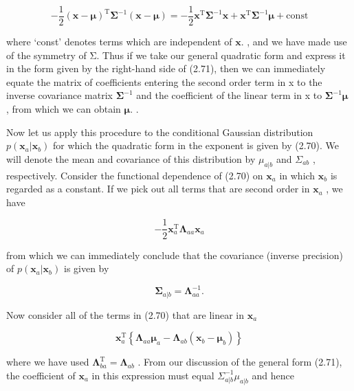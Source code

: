 \documentclass[
  10
]{article}
\begin{document}
\[
- \frac {1}{2} (\mathbf {x} - \boldsymbol {\mu}) ^ {\mathrm{T}} \boldsymbol {\Sigma} ^ {- 1} (\mathbf {x} - \boldsymbol {\mu}) = - \frac {1}{2} \mathbf {x} ^ {\mathrm{T}} \boldsymbol {\Sigma} ^ {- 1} \mathbf {x} + \mathbf {x} ^ {\mathrm{T}} \boldsymbol {\Sigma} ^ {- 1} \boldsymbol {\mu} + \mathrm{const}\tag{2.71}
\]

where `const' denotes terms which are independent of \(\mathbf { x } .\)
, and we have made use of the symmetry of Σ. Thus if we take our general
quadratic form and express it in the form given by the right-hand side
of (2.71), then we can immediately equate the matrix of coefficients
entering the second order term in x to the inverse covariance matrix
\(\pmb { \Sigma } ^ { - 1 }\) and the coefficient of the linear term in
x to \(\pmb { \Sigma } ^ { - 1 } \pmb { \mu }\) , from which we can
obtain \(\pmb { \mu } .\) .

Now let us apply this procedure to the conditional Gaussian distribution
\(p ( \mathbf { x } _ { a } | \mathbf { x } _ { b } )\) for which the
quadratic form in the exponent is given by (2.70). We will denote the
mean and covariance of this distribution by
\(\mu _ { a \left| b \right. }\) and \(\Sigma _ { a \left. b \right. }\)
, respectively. Consider the functional dependence of (2.70) on
\(\mathbf { x } _ { a }\) in which \(\mathbf { x } _ { b }\) is regarded
as a constant. If we pick out all terms that are second order in
\(\mathbf { x } _ { a }\) , we have

\[
- \frac {1}{2} \mathbf {x} _ {a} ^ {\mathrm{T}} \boldsymbol {\Lambda} _ {a a} \mathbf {x} _ {a}\tag{2.72}
\]

from which we can immediately conclude that the covariance (inverse
precision) of \(p ( \mathbf { x } _ { a } | \mathbf { x } _ { b } )\) is
given by

\[
\pmb {\Sigma} _ {a | b} = \pmb {\Lambda} _ {a a} ^ {- 1}.\tag{2.73}
\]

Now consider all of the terms in (2.70) that are linear in
\(\mathbf { x } _ { a }\)

\[
\mathbf {x} _ {a} ^ {\mathrm{T}} \left\{\boldsymbol {\Lambda} _ {a a} \pmb {\mu} _ {a} - \boldsymbol {\Lambda} _ {a b} (\mathbf {x} _ {b} - \pmb {\mu} _ {b}) \right\}\tag{2.74}
\]

where we have used
\(\pmb { \Lambda } _ { b a } ^ { \mathrm { T } } = \pmb { \Lambda } _ { a b }\)
. From our discussion of the general form (2.71), the coefficient of
\(\mathbf { x } _ { a }\) in this expression must equal
\(\Sigma _ { a | b } ^ { - 1 } \mu _ { a | b }\) and hence
\end{document}
